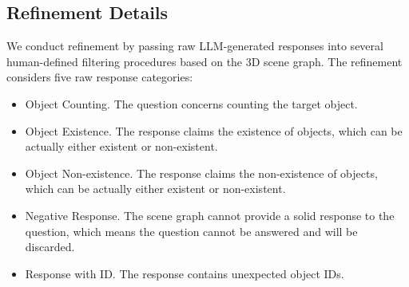\subsection{Refinement Details}\label{app:dataset:refine:examples}
We conduct refinement by passing raw LLM-generated responses into several human-defined filtering procedures based on the 3D scene graph. The refinement considers five raw response categories:
\begin{itemize}[leftmargin=*,nolistsep]
    \item Object Counting. The question concerns counting the target object.
    \item Object Existence. The response claims the existence of objects, which can be actually either existent or non-existent.
    \item Object Non-existence. The response claims the non-existence of objects, which can be actually either existent or non-existent.
    \item Negative Response. The scene graph cannot provide a solid response to the question, which means the question cannot be answered and will be discarded.
    \item Response with ID. The response contains unexpected object IDs.
\end{itemize} 

